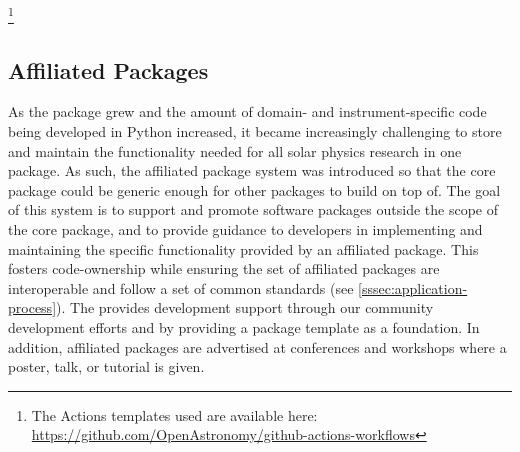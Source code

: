 \footnote{The \github Actions templates used are available here: \url{https://github.com/OpenAstronomy/github-actions-workflows}}

\subsection{Affiliated Packages}
\label{ssec:affiliated-packages}

As the \sunpypkg package grew and the amount of domain- and instrument-specific code being developed in Python increased, it became increasingly challenging to store and maintain the functionality needed for all solar physics research in one package.
As such, the affiliated package system was introduced \citep{mumford_stuart_2014_3261752} so that the \sunpypkg core package could be generic enough for other packages to build on top of.
The goal of this system is to support and promote software packages outside the scope of the \sunpypkg core package, and to provide guidance to developers in implementing and maintaining the specific functionality provided by an affiliated package.
This fosters code-ownership while ensuring the set of affiliated packages are interoperable and follow a set of common standards (see \autoref{sssec:application-process}).
The \sunpyproj provides development support through our community development efforts and by providing a package template as a foundation.
In addition, affiliated packages are advertised at conferences and workshops where a \sunpy poster, talk, or tutorial is given.

